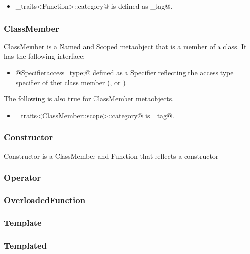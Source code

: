 \begin{itemize}
	\item \verb@metaobject_traits<Function>::category@ is defined as \verb@function_tag@.
\end{itemize}

\subsubsection{ClassMember}

{\metaobject ClassMember} is a {\metaobject Named} and {\metaobject Scoped} metaobject
that is a member of a class. It has the following interface:

\begin{itemize}
	\item{\verb@typedef @{\metaobject Specifier}\verb@ access_type;@} defined as
	a {\metaobject Specifier} reflecting the access type specifier of ther class member
	(\verb@private@, \verb@protected@ or \verb@public@).
\end{itemize}

The following is also true for {\metaobject ClassMember} metaobjects.

\begin{itemize}
	\item \verb@metaobject_traits<ClassMember::scope>::category@ is \verb@class_tag@.
\end{itemize}

\subsubsection{Constructor}

{\metaobject Constructor} is a {\metaobject ClassMember} and {\metaobject Function} that
reflects a constructor.

\subsubsection{Operator}

\subsubsection{OverloadedFunction}

\subsubsection{Template}

\subsubsection{Templated}

